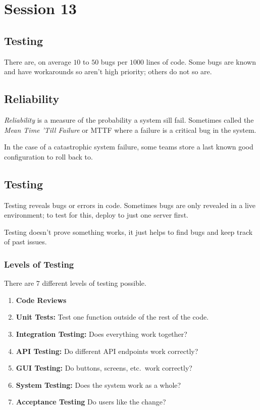 \section{Session 13}\label{sec:session_13_one}

\subsection{Testing}\label{sub:testing}

There are, on average \(10\) to \(50\) bugs per \(1000\) lines of code.
Some bugs are known and have workarounds so aren't high priority; others do not so are.

\subsection{Reliability}\label{ssub:reliability}

\emph{Reliability} is a measure of the probability a system sill fail.
Sometimes called the \emph{Mean Time 'Till Failure} or MTTF where a failure is a critical bug in the system.

In the case of a catastrophic system failure, some teams store a last known good configuration to roll back to.

\subsection{Testing}\label{ssub:testing}

Testing reveals bugs or errors in code.
Sometimes bugs are only revealed in a live environment; to test for this, deploy to just one server first.

\begin{note}
	Testing doesn't prove something works, it just helps to find bugs and keep track of past issues.
\end{note}

\subsubsection{Levels of Testing}\label{ssub:levels_of_testing}

There are \(7\) different levels of testing possible.

\begin{enumerate}
	\item \textbf{Code Reviews}
	\item \textbf{Unit Tests:} Test one function outside of the rest of the code.
	\item \textbf{Integration Testing:} Does everything work together?
	\item \textbf{API Testing:} Do different API endpoints work correctly?
	\item \textbf{GUI Testing:} Do buttons, screens, etc.\ work correctly?
	\item \textbf{System Testing:} Does the system work as a whole?
	\item \textbf{Acceptance Testing} Do users like the change?
\end{enumerate}

